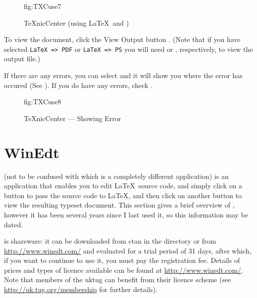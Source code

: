 \begin{figure}[hbtp]
  {\caption[TeXnicCenter (using LaTeX and dvips)]{TeXnicCenter (using \LaTeX\ and )}}
  {fig:TXCuse7}
\end{figure}

\label{TXC:yap}
To view the document, click the View Output button 
.
(Note that if you have selected \verb|LaTeX => PDF| or
\verb|LaTeX => PS| you will need 
or , respectively, to view the output file.)

\label{TXCerrors}
If there are any errors, you can select  and it will show you where the error has occured (See
).  If you do have any errors, check
.

\begin{figure}[hbtp]
  {\caption{TeXnicCenter --- Showing Error}}
  {fig:TXCuse8}
\end{figure}



\section{WinEdt}
\label{sec:winedt}

 (not to be confused with  which is
a completely different application) is an application that enables
you to edit \LaTeX\ source code, and simply click on a button to pass
the source code to \LaTeX, and then click on another button to view
the resulting typeset document.  This section gives a brief overview
of , however it has been several years since I
last used it, so this information may be dated.

 is shareware: it can be downloaded from \gls{ctan} in the
directory or from \url{http://www.winedt.com/} and evaluated for a
trial period of 31 days, after which, if you want to continue to use
it, you must pay the registration fee.  Details of prices and types
of licence available can be found at \url{http://www.winedt.com/}.
Note that members of the \gls{uktug} can benefit from their 
 licence
scheme (see \url{http://uk.tug.org/membership} for further details).

